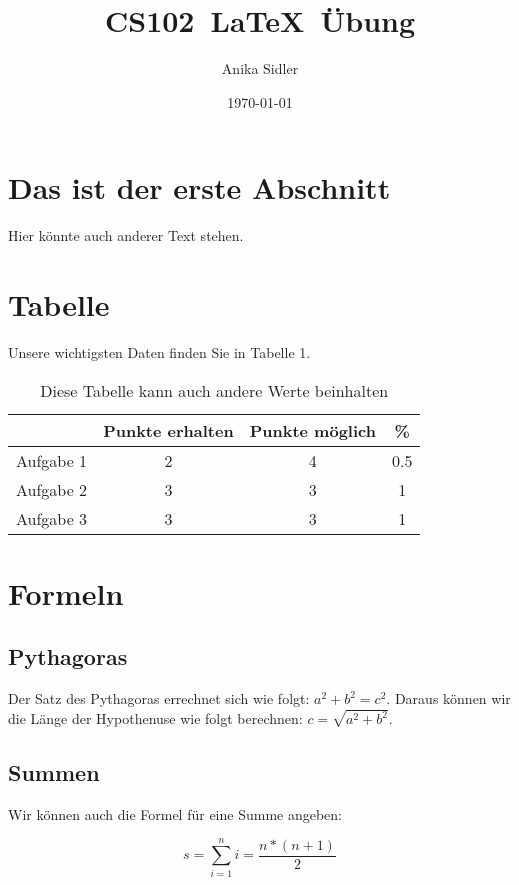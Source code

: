 \documentclass{article}
\author{Anika Sidler}
\title{CS102\ \LaTeX\ Übung}
\date{\today}
\begin{document}
\maketitle
\section{Das ist der erste Abschnitt}
Hier könnte auch anderer Text stehen.
\section{Tabelle}
Unsere wichtigsten Daten finden Sie in Tabelle 1.
\begin{table}[h]
\begin{tabular}{c|c|c|c}
\quad & Punkte erhalten & Punkte möglich & \% \\
\hline
Aufgabe 1 & 2 & 4 & 0.5\\
Aufgabe 2 & 3 & 3 & 1\\
Aufgabe 3 & 3 & 3 & 1\\
\end{tabular}
\caption{Diese Tabelle kann auch andere Werte beinhalten}
\end{table}
\label{Tab 1}
\section{Formeln}
\subsection{Pythagoras}
Der Satz des Pythagoras errechnet sich wie folgt: $a^{2}+b^{2}=c^{2}.$ Daraus können wir die Länge der Hypothenuse wie folgt berechnen: $c=\sqrt{a^{2}+b^{2}}.$
\subsection{Summen}
\begin{flushleft}
Wir können auch die Formel für eine Summe angeben:\\
\end{flushleft}
\begin{equation}
s=\sum_{i=1}^n{i}=\frac{n*(n+1)}{2}
\end{equation}
\end{document}
